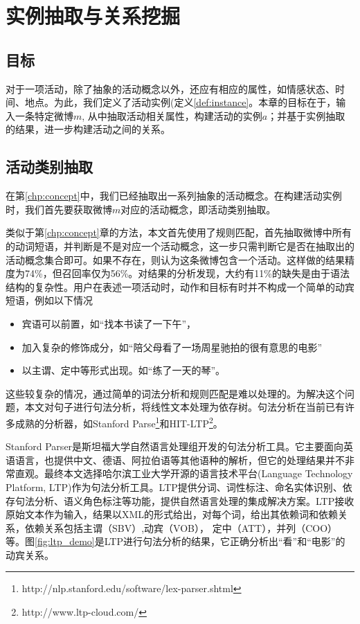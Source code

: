 \chapter{实例抽取与关系挖掘}
\section{目标}
对于一项活动，除了抽象的活动概念以外，还应有相应的属性，如情感状态、时间、地点。为此，我们定义了活动实例(定义\ref{def:instance}。本章的目标在于，输入一条特定微博$m$, 从中抽取活动相关属性，构建活动的实例$a$；并基于实例抽取的结果，进一步构建活动之间的关系。

\section{活动类别抽取}

在第\ref{chp:concept}中，我们已经抽取出一系列抽象的活动概念。在构建活动实例时，我们首先要获取微博$m$对应的活动概念，即活动类别抽取。

类似于第\ref{chp:concept}章的方法，本文首先使用了规则匹配，首先抽取微博中所有的动词短语，并判断是不是对应一个活动概念，这一步只需判断它是否在抽取出的活动概念集合即可。如果不存在，则认为这条微博包含一个活动。这样做的结果精度为74\%，但召回率仅为56\%。对结果的分析发现，大约有11\%的缺失是由于语法结构的复杂性。用户在表述一项活动时，动作和目标有时并不构成一个简单的动宾短语，例如以下情况
\begin{itemize}
\item 宾语可以前置，如``找本书读了一下午''，
\item 加入复杂的修饰成分，如``陪父母看了一场周星驰拍的很有意思的电影''
\item 以主谓、定中等形式出现。如``练了一天的琴''。
\end{itemize}
这些较复杂的情况，通过简单的词法分析和规则匹配是难以处理的。为解决这个问题，本文对句子进行句法分析，将线性文本处理为依存树。句法分析在当前已有许多成熟的分析器，如Stanford Parse\footnote{http://nlp.stanford.edu/software/lex-parser.shtml}和HIT-LTP\footnote{http://www.ltp-cloud.com/}。

Stanford Parser是斯坦福大学自然语言处理组开发的句法分析工具。它主要面向英语语言，也提供中文、德语、阿拉伯语等其他语种的解析，但它的处理结果并不非常直观。最终本文选择哈尔滨工业大学开源的语言技术平台(Language Technology Platform, LTP)\cite{che2010ltp}作为句法分析工具。LTP提供分词、词性标注、命名实体识别、依存句法分析、语义角色标注等功能，提供自然语言处理的集成解决方案。LTP接收原始文本作为输入，结果以XML的形式给出，对每个词，给出其依赖词和依赖关系，依赖关系包括主谓（SBV）,动宾（VOB）， 定中（ATT），并列（COO）等。图\ref{fig:ltp_demo}是LTP进行句法分析的结果，它正确分析出``看''和``电影''的动宾关系。

